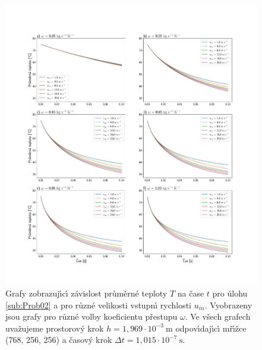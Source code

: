         \begin{figure}[H]
            \centering
            \includegraphics[width=\linewidth, trim=4cm 4cm 4cm 8cm]{Img/Kapitola 3/Probl10_a.pdf}
            \caption{Grafy zobrazuj\'{\i}c\'{\i} z\'{a}vislost pr\r{u}m\v{e}rn\'{e} teploty $T$ na \v{c}ase $t$ pro \'{u}lohu \ref{sub:Prob02} a pro r\r{u}zn\'{e} velikosti vstupn\'{\i} rychlosti $u_{in}$. Vyobrazeny jsou grafy pro r\r{u}zn\'{e} volby koeficientu p\v{r}estupu $\omega$. Ve v\v{s}ech grafech uva\v{z}ujeme prostorov\'{y} krok $h = 1{,}969 \cdot 10^{-3} \ \mathrm{m}$ odpov\'{\i}daj\'{\i}c\'{\i} m\v{r}\'{\i}\v{z}ce (768, 256, 256) a \v{c}asov\'{y} krok $\Delta t = 1{,}015 \cdot 10^{-7} \ \mathrm{s}$.}
            \label{fig:Probl10_a}
        \end{figure}


